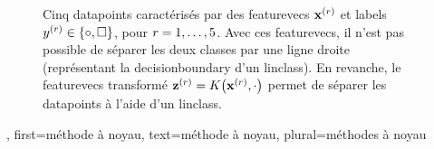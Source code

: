 {{\begin{figure}[H]
\begin{center}
		\end{center}
		\caption{
			Cinq \glspl{datapoint} caractérisés par des \glspl{featurevec} ${\bf x}^{(r)}$ 
			et \glspl{label} $y^{(r)} \in \{ \circ, \square \}$, pour $r=1, \ldots, 5$. 
			Avec ces \glspl{featurevec}, il n'est pas possible de séparer les deux classes par une ligne droite (représentant la \gls{decisionboundary} d'un \gls{linclass}). En revanche, le \glspl{featurevec} transformé ${\bf z}^{(r)} = K\big({\bf x}^{(r)},\cdot\big)$ permet de séparer les \glspl{datapoint} à l'aide d'un \gls{linclass}.  \label{fig_linsep_kernel_dict}}
	\end{figure}
	},
	first={méthode à noyau},
	text={méthode à noyau}, plural={méthodes à noyau}
}

